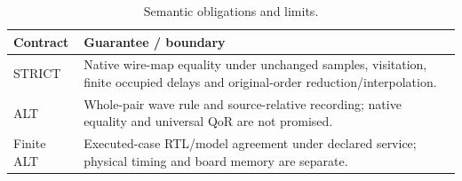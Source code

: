 \begin{table}[t]\centering\caption{Semantic obligations and limits.}\label{tab:guarantees}
\begin{tabular}{lp{5.7cm}}\toprule Contract & Guarantee / boundary\\\midrule
STRICT & Native wire-map equality under unchanged samples, visitation, finite occupied delays and original-order reduction/interpolation.\\
ALT & Whole-pair wave rule and source-relative recording; native equality and universal QoR are not promised.\\
Finite ALT & Executed-case RTL/model agreement under declared service; physical timing and board memory are separate.\\\bottomrule\end{tabular}\end{table}
